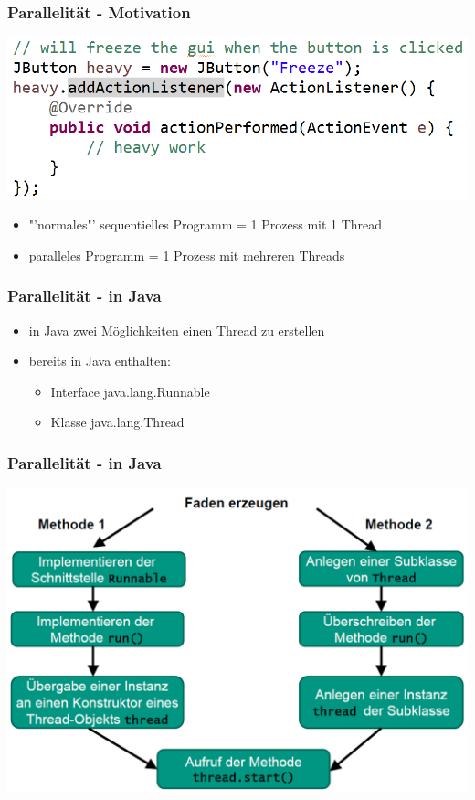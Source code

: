 \documentclass[18pt]{beamer}
\begin{document}
	
	\begin{frame}
		\frametitle{Parallelität - Motivation}
		\includegraphics[scale=0.34]{./pics/tut5/mot-par.png}
		\pause
		\begin{itemize}
			\item "'normales"' sequentielles Programm = 1 Prozess mit 1 Thread
			\item paralleles Programm = 1 Prozess mit mehreren Threads
		\end{itemize}
	\end{frame}

	\begin{frame}
		\frametitle{Parallelität - in Java}
		\begin{itemize}
			\item in Java zwei Möglichkeiten einen Thread zu erstellen
			\item bereits in Java enthalten:
			\begin{itemize}
				\item Interface java.lang.Runnable
				\item Klasse java.lang.Thread
			\end{itemize}
		\end{itemize}
	\end{frame}

	\begin{frame}
		\frametitle{Parallelität - in Java}
		\includegraphics[scale=0.34]{./pics/tut5/crea-thr.png}
	\end{frame}
\end{document}
